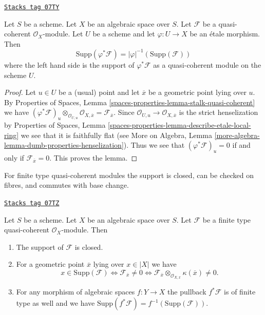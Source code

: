\begin{lemma}
\label{spaces-morphisms-lemma-support-covering}
\href{https://stacks.math.columbia.edu/tag/07TY}{\texttt{Stacks tag 07TY}}

Let $S$ be a scheme. Let $X$ be an algebraic space over $S$.
Let $\mathcal{F}$ be a quasi-coherent $\mathcal{O}_X$-module.
Let $U$ be a scheme and let $\varphi : U \to X$ be an \'etale morphism.
Then
$$
\text{Supp}(\varphi^*\mathcal{F}) = |\varphi|^{-1}(\text{Supp}(\mathcal{F}))
$$
where the left hand side is the support of $\varphi^*\mathcal{F}$ as a
quasi-coherent module on the scheme $U$.
\end{lemma}

\begin{proof}
Let $u\in U$ be a (usual) point and let $\overline{x}$ be a
geometric point lying over $u$. By
Properties of Spaces, Lemma \ref{spaces-properties-lemma-stalk-quasi-coherent}
we have
$(\varphi^*\mathcal{F})_u \otimes_{\mathcal{O}_{U, u}}
\mathcal{O}_{X, \overline{x}} = \mathcal{F}_{\overline{x}}$.
Since $\mathcal{O}_{U, u} \to \mathcal{O}_{X, \overline{x}}$
is the strict henselization by
Properties of Spaces, Lemma
\ref{spaces-properties-lemma-describe-etale-local-ring}
we see that it is faithfully flat (see
More on Algebra, Lemma
\ref{more-algebra-lemma-dumb-properties-henselization}).
Thus we see that $(\varphi^*\mathcal{F})_u = 0$ if and only if
$\mathcal{F}_{\overline{x}} = 0$. This proves the lemma.
\end{proof}

For finite type quasi-coherent modules the support is closed,
can be checked on fibres, and commutes with base change.

\begin{lemma}
\label{spaces-morphisms-lemma-support-finite-type}
\href{https://stacks.math.columbia.edu/tag/07TZ}{\texttt{Stacks tag 07TZ}}

Let $S$ be a scheme. Let $X$ be an algebraic space over $S$.
Let $\mathcal{F}$ be a finite type quasi-coherent $\mathcal{O}_X$-module.
Then
\begin{enumerate}
\item The support of $\mathcal{F}$ is closed.
\item For a geometric point $\overline{x}$ lying over $x \in |X|$ we have
$$
x \in \text{Supp}(\mathcal{F})
\Leftrightarrow
\mathcal{F}_{\overline{x}} \not = 0
\Leftrightarrow
\mathcal{F}_{\overline{x}} \otimes_{\mathcal{O}_{X, \overline{x}}}
\kappa(\overline{x}) \not = 0.
$$
\item For any morphism of algebraic spaces $f : Y \to X$ the pullback
$f^*\mathcal{F}$ is of finite type as well and we have
$\text{Supp}(f^*\mathcal{F}) = f^{-1}(\text{Supp}(\mathcal{F}))$.
\end{enumerate}
\end{lemma}

